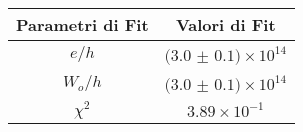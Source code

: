 \begin{tabular}{cc}
\hline
	Parametri di Fit & Valori di Fit\\ 
\hline
	$e/h$ & $(3.0$ $\pm$ $0.1)\times 10^{14}$ \\
	$W_o/h$ & $(3.0$ $\pm$ $0.1)\times 10^{14}$ \\
	$\chi^2$ & $3.89\times 10^{-1}$ \\
\hline
\end{tabular}
